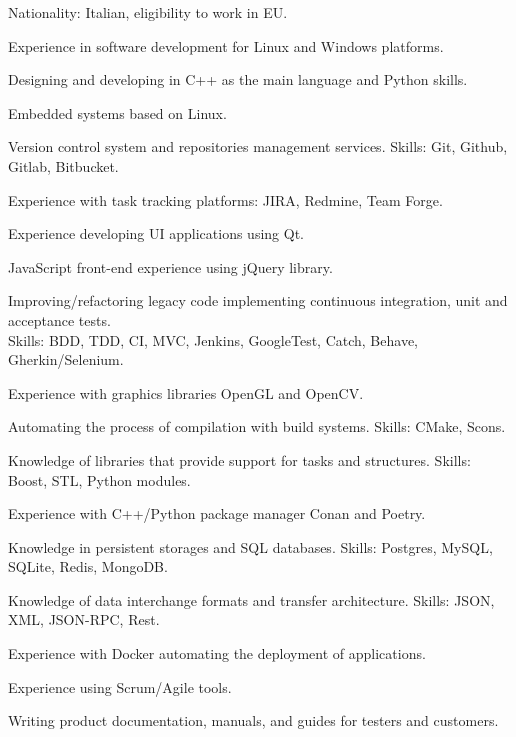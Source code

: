

\begin{cvparagraph}

  \begin{svitems}
    \item {Nationality: Italian, eligibility to work in EU.}
    \item {Experience in software development for Linux and Windows platforms.}
    \item {Designing and developing in C++ as the main language and Python skills.}
    \item {Embedded systems based on Linux.}
    \item {Version control system and repositories management services. Skills: Git, Github, Gitlab, Bitbucket.}
    \item {Experience with task tracking platforms: JIRA, Redmine, Team Forge.}
    \item {Experience developing UI applications using Qt.}
    \item {JavaScript front-end experience using jQuery library.}
    \item {Improving/refactoring legacy code implementing continuous integration, unit and acceptance tests.\\
    Skills: BDD, TDD, CI, MVC, Jenkins, GoogleTest, Catch, Behave, Gherkin/Selenium.}
    \item {Experience with graphics libraries OpenGL and OpenCV.}
    \item {Automating the process of compilation with build systems. Skills: CMake, Scons.}
    \item {Knowledge of libraries that provide support for tasks and structures. Skills: Boost, STL, Python modules.}
    \item {Experience with C++/Python package manager Conan and Poetry.}
    \item {Knowledge in persistent storages and SQL databases. Skills: Postgres, MySQL, SQLite, Redis, MongoDB.}
    \item {Knowledge of data interchange formats and transfer architecture. Skills: JSON, XML, JSON-RPC, Rest.}
    \item {Experience with Docker automating the deployment of applications.}
    \item {Experience using Scrum/Agile tools.}
    \item {Writing product documentation, manuals, and guides for testers and customers.}
  \end{svitems}
\end{cvparagraph}

